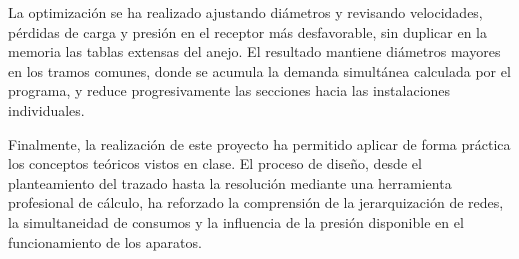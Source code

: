 \documentclass[12pt,a4paper]{article}
\begin{document}
La optimización se ha realizado ajustando diámetros y revisando velocidades, pérdidas de carga y presión en el receptor más desfavorable, sin duplicar en la memoria las tablas extensas del anejo. El resultado mantiene diámetros mayores en los tramos comunes, donde se acumula la demanda simultánea calculada por el programa, y reduce progresivamente las secciones hacia las instalaciones individuales.

Finalmente, la realización de este proyecto ha permitido aplicar de forma práctica los conceptos teóricos vistos en clase. El proceso de diseño, desde el planteamiento del trazado hasta la resolución mediante una herramienta profesional de cálculo, ha reforzado la comprensión de la jerarquización de redes, la simultaneidad de consumos y la influencia de la presión disponible en el funcionamiento de los aparatos.


\cleardoublepage
{}
{}
\printbibliography[title={Bibliografía}]


\label{anex:planos}






\label{anex:calculos}

\end{document}
